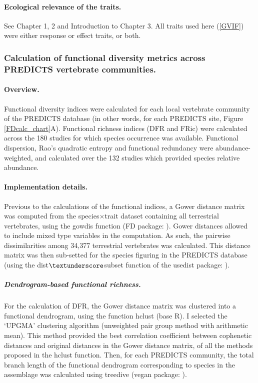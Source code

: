 \paragraph{Ecological relevance of the traits.} See Chapter 1, 2 and Introduction to Chapter 3. All traits used here (\ref{GVIF}) were either response or effect traits, or both.
 

\subsubsection{Calculation of functional diversity metrics across PREDICTS vertebrate communities.}

\paragraph{Overview.}
Functional diversity indices were calculated for each local vertebrate community of the PREDICTS database (in other words, for each PREDICTS site, Figure  \ref{FDcalc_chart}A). Functional richness indices (DFR and FRic) were calculated across the 180 studies for which species occurrence was available. Functional dispersion, Rao's quadratic entropy and functional redundancy were abundance-weighted, and calculated over the 132 studies which provided species relative abundance.
 
\paragraph{Implementation details.}
Previous to the calculations of the functional indices, a Gower distance matrix was computed from the species$\times$trait dataset containing all terrestrial vertebrates, using the gowdis function (FD package: \citet{Laliberte2010, Laliberte2015}). Gower distances allowed to include mixed type variables in the computation. As such, the pairwise dissimilarities among 34,377 terrestrial vertebrates was calculated. This distance matrix was then sub-setted for the species figuring in the PREDICTS database (using the dist$\textunderscore$subset function of the usedist package: \citet{usedist}).

\subparagraph{Dendrogram-based functional richness.} For the calculation of DFR, the Gower distance matrix was clustered into a functional dendrogram, using the function hclust (base R). I selected the `UPGMA' clustering algorithm (unweighted pair group method with arithmetic mean). This method provided the best correlation coefficient between cophenetic distances and original distances in the Gower distance matrix, of all the methods proposed in the hclust function. Then, for each PREDICTS community, the total branch length of the functional dendrogram corresponding to species in the assemblage was calculated using treedive (vegan package: \citet{vegan}). 

